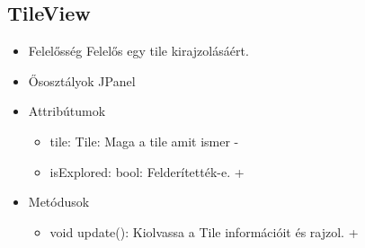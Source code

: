 \subsection{TileView}
\begin{itemize}
	\item Felelősség\newline
	Felelős egy tile kirajzolásáért.
	\item Ősosztályok\newline
	JPanel
	\item Attribútumok\newline
	\begin{itemize}
		\item tile: Tile: Maga a tile amit ismer -
		\item isExplored: bool: Felderítették-e. +
	\end{itemize}
	\item Metódusok\newline
	\begin{itemize}
		\item void update(): Kiolvassa a Tile információit és rajzol. +
	\end{itemize}
\end{itemize}

